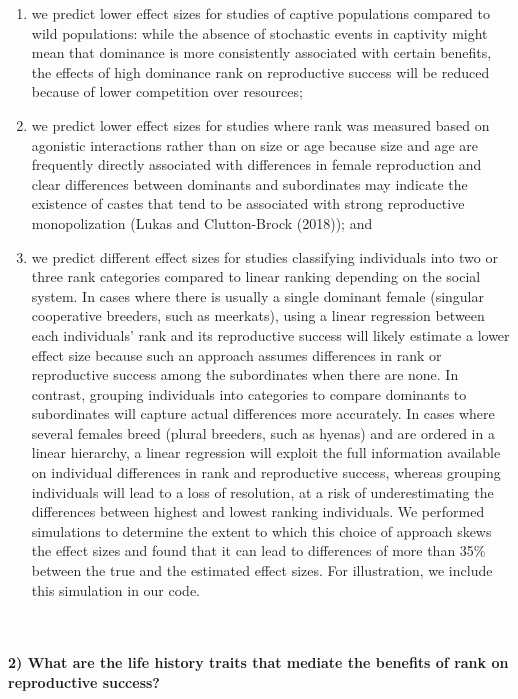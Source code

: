 \documentclass[]{article}
\providecommand{\tightlist}{%
  \setlength{\itemsep}{0pt}\setlength{\parskip}{0pt}}
\let\oldparagraph\paragraph
\renewcommand{\paragraph}[1]{\oldparagraph{#1}\mbox{}}
\begin{document}
\begin{enumerate}
\def\labelenumi{(\roman{enumi})}
\tightlist
\item
  we predict lower effect sizes for studies of captive populations
  compared to wild populations: while the absence of stochastic events
  in captivity might mean that dominance is more consistently associated
  with certain benefits, the effects of high dominance rank on
  reproductive success will be reduced because of lower competition over
  resources;
\item
  we predict lower effect sizes for studies where rank was measured
  based on agonistic interactions rather than on size or age because
  size and age are frequently directly associated with differences in
  female reproduction and clear differences between dominants and
  subordinates may indicate the existence of castes that tend to be
  associated with strong reproductive monopolization (Lukas and
  Clutton-Brock (2018)); and
\item
  we predict different effect sizes for studies classifying individuals
  into two or three rank categories compared to linear ranking depending
  on the social system. In cases where there is usually a single
  dominant female (singular cooperative breeders, such as meerkats),
  using a linear regression between each individuals' rank and its
  reproductive success will likely estimate a lower effect size because
  such an approach assumes differences in rank or reproductive success
  among the subordinates when there are none. In contrast, grouping
  individuals into categories to compare dominants to subordinates will
  capture actual differences more accurately. In cases where several
  females breed (plural breeders, such as hyenas) and are ordered in a
  linear hierarchy, a linear regression will exploit the full
  information available on individual differences in rank and
  reproductive success, whereas grouping individuals will lead to a loss
  of resolution, at a risk of underestimating the differences between
  highest and lowest ranking individuals. We performed simulations to
  determine the extent to which this choice of approach skews the effect
  sizes and found that it can lead to differences of more than 35\%
  between the true and the estimated effect sizes. For illustration, we
  include this simulation in our code.
\end{enumerate}

~

\hypertarget{what-are-the-life-history-traits-that-mediate-the-benefits-of-rank-on-reproductive-success-1}{%
\paragraph{\texorpdfstring{\textbf{2) What are the life history traits
that mediate the benefits of rank on reproductive
success?}}{2) What are the life history traits that mediate the benefits of rank on reproductive success?}}\label{what-are-the-life-history-traits-that-mediate-the-benefits-of-rank-on-reproductive-success-1}}
\end{document}
